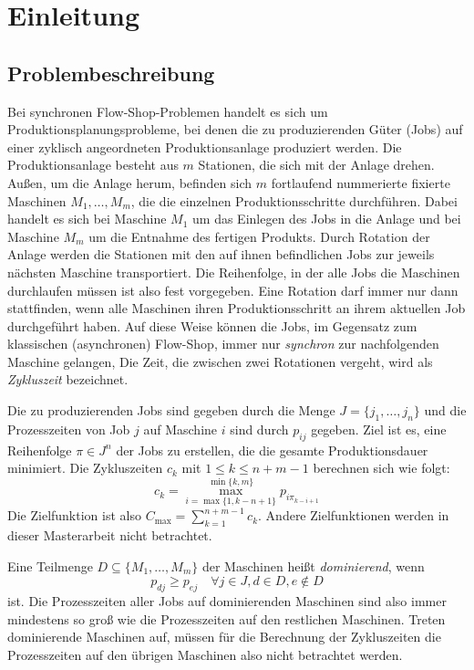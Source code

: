 \documentclass{scrreprt}
\begin{document}
\tableofcontents

\chapter{Einleitung}
\section{Problembeschreibung}
Bei synchronen Flow-Shop-Problemen handelt es sich um Produktions\-planungs\-probleme,
bei denen die zu produzierenden Güter (Jobs) auf einer zyklisch angeordneten Produktionsanlage
produziert werden. Die Produktionsanlage be\-steht aus $m$ Stationen, die sich mit der Anlage drehen.
Außen, um die Anlage herum, befinden sich $m$ fortlaufend nummerierte fixierte Maschinen $M_1,\ldots,M_m$, die die einzelnen Produktionsschritte durchführen.
Dabei handelt es sich bei Maschine $M_1$ um das Einlegen des Jobs in die Anlage und bei Maschine $M_m$ um die Entnahme des fertigen Produkts.
Durch Rotation der Anlage werden die Stationen mit den auf ihnen befindlichen Jobs zur jeweils nächsten Maschine transportiert.
Die Reihenfolge, in der alle Jobs die Maschinen durchlaufen müssen ist also fest vorgegeben.
Eine Rotation darf immer nur dann stattfinden, wenn alle Maschinen ihren Produktionsschritt an ihrem aktuellen Job
durchgeführt haben. Auf diese Weise können die Jobs, im Gegensatz zum klassischen (asynchronen) Flow-Shop, 
immer nur \textit{synchron} zur nachfolgenden Maschine gelangen,
Die Zeit, die zwischen zwei Rotationen vergeht, wird als \textit{Zykluszeit} bezeichnet.

Die zu produzierenden Jobs sind gegeben durch die Menge $J=\{j_1,\ldots,j_n\}$ 
und die Prozesszeiten von Job $j$ auf Maschine $i$ sind durch $p_{ij}$ gegeben.
Ziel ist es, eine Reihenfolge $\pi\in J^n$ der Jobs zu erstellen, die die gesamte Produktionsdauer minimiert.
Die Zykluszeiten $c_k$ mit $1\leq k\leq n+m-1$ berechnen sich wie folgt:
\[ c_k = \max_{i=\max\{1,k-n+1\}}^{\min\{k,m\}} p_{i\pi_{k-i+1}} \]
Die Zielfunktion ist also $C_{\max} = \sum_{k=1}^{n+m-1} c_k$. 
Andere Zielfunktionen werden in dieser Masterarbeit nicht betrachtet.

Eine Teilmenge $D \subseteq \{M_1,\ldots,M_m\}$ der Maschinen heißt \textit{dominierend}, wenn 
\[ p_{dj} \geq p_{ej} \quad \forall j\in J, d\in D, e\not\in D \] 
ist. Die Prozesszeiten aller Jobs auf dominierenden Maschinen sind also immer mindestens so groß wie die Prozesszeiten auf den restlichen Maschinen.
Treten dominierende Maschinen auf, müssen für die Berechnung der Zykluszeiten die Prozesszeiten auf den übrigen Maschinen also nicht betrachtet werden.
\end{document}
